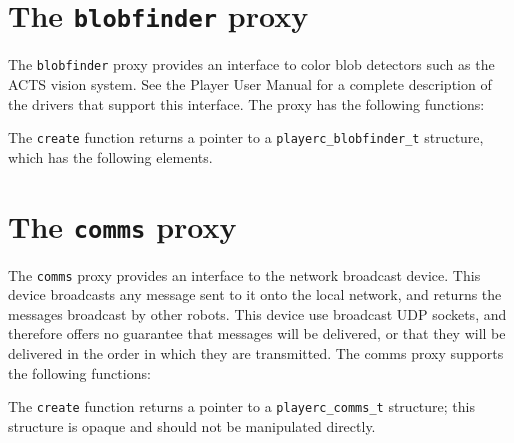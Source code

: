 \documentclass[11pt]{report}
\begin{document}
%
%
%
%


\newpage
\section{The {\tt blobfinder} proxy}

The {\tt blobfinder} proxy provides an interface to color blob
detectors such as the ACTS vision system.  See the Player User Manual
for a complete description of the drivers that support this interface.
The proxy has the following functions:
\begin{quote}

\end{quote}
The {\tt create} function returns a pointer to a {\tt playerc\_blobfinder\_t}
structure, which has the following elements.
\begin{quote}

\end{quote}


\newpage
\section{The {\tt comms} proxy}

The {\tt comms} proxy provides an interface to the network broadcast
device.  This device broadcasts any message sent to it onto the local
network, and returns the messages broadcast by other robots.  This
device use broadcast UDP sockets, and therefore offers no guarantee
that messages will be delivered, or that they will be delivered in the
order in which they are transmitted.  The comms proxy supports the
following functions:
\begin{quote}

\end{quote}
The {\tt create} function returns a pointer to a {\tt playerc\_comms\_t}
structure; this structure is opaque and should not be manipulated directly.
\end{document}
